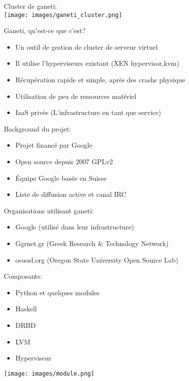\documentclass{beamer}
\begin{document}
\begin{frame}
Cluster de ganeti:\\
 \texttt{[image: images/ganeti\_cluster.png]}
\end{frame}

\begin{frame}
Ganeti, qu'est-ce que c'est?\\
\begin{itemize}
\item Un outil de gestion de cluster de serveur virtuel
\item Il utilise l'hyperviseurs existant (XEN hypervisor,kvm)
\item Récupération rapide et simple, après des crashs physique
\item Utilisation de peu de ressources matériel
\item IaaS privés (L'infrastructure en tant que service)
\end{itemize}
\end{frame}

\begin{frame}
Background du projet:\\
\begin{itemize}
\item Projet financé par Google
\item Open source depuis 2007 GPLv2
\item Équipe Google basée en Suisse
\item Liste de diffusion active et canal IRC
\end{itemize}
Organisations utilisant ganeti:\\
\begin{itemize}
\item Google (utilisé dans leur infrastructure)
\item Ggrnet.gr (Greek Research \& Technology Network)
\item osuosl.org (Oregon State University Open Source Lab)
\end{itemize}
\end{frame}

\begin{frame}
Composants:\\
\begin{itemize}
\item Python et quelques modules
\item Haskell
\item DRBD
\item LVM
\item Hyperviseur
\end{itemize}
\texttt{[image: images/module.png]}
\end{frame}
\end{document}
